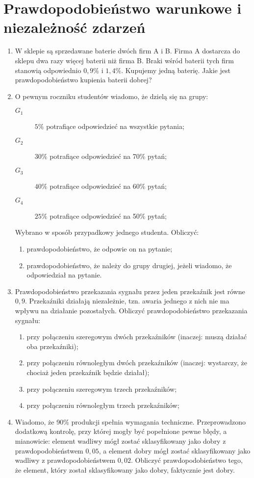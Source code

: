 \documentclass[twoside]{mwart}
\newcommand{\ans}[1]{}
\newcommand{\ans}[1]{\par\emph{Odpowiedź:} #1}
\begin{document}
\section{Prawdopodobieństwo warunkowe i niezależność zdarzeń}
\begin{enumerate}
\item W sklepie są sprzedawane baterie dwóch firm A i B. Firma A dostarcza do sklepu dwa razy więcej baterii niż firma B. Braki wśród baterii tych firm stanowią odpowiednio $0{,}9\%$ i $1{,}4\%$. Kupujemy jedną baterię. Jakie jest prawdopodobieństwo kupienia baterii dobrej?
\item O pewnym roczniku studentów wiadomo, że dzielą się na grupy:
\begin{description}
\item[$G_1$] $5\%$ potrafiące odpowiedzieć na wszystkie pytania;
\item[$G_2$] $30\%$ potrafiące odpowiedzieć na 70\% pytań;
\item[$G_3$] $40\%$ potrafiące odpowiedzieć na 60\% pytań;
\item[$G_4$] $25\%$ potrafiące odpowiedzieć na 50\% pytań;
\end{description}
Wybrano w sposób przypadkowy jednego studenta. Obliczyć:
\begin{enumerate}
\item prawdopodobieństwo, że odpowie on na pytanie; \ans{$P(O)=\sum P(O|G_i)P(G_i)=0{,}625$}
\item prawdopodobieństwo, że należy do grupy drugiej, jeżeli wiadomo, że odpowiedział na pytanie. \ans{$P(G_2|O)=\frac{P(O|G_2)|P(G_2)}{P(O)}=0{,}336$}
\end{enumerate}
\item Prawdopodobieństwo przekazania sygnału przez jeden przekaźnik jest równe $0{,}9$. Przekaźniki działają niezależnie, tzn. awaria jednego z nich nie ma wpływu na działanie pozostałych.
Obliczyć prawdopodobieństwo przekazania sygnału:
\begin{enumerate}
\item przy połączeniu szeregowym dwóch przekaźników (inaczej: muszą działać oba przekaźniki);
\item przy połączeniu równoległym dwóch przekaźników (inaczej: wystarczy, że chociaż jeden przekaźnik będzie działał);
\item przy połączeniu szeregowym trzech przekaźników;
\item przy połączeniu równoległym trzech przekaźników;
\end{enumerate}
\item Wiadomo, że 90\% produkcji spełnia wymagania techniczne. Przeprowadzono dodatkową kontrolę, przy której mogły być popełnione pewne błędy, a mianowicie: element wadliwy mógł zostać sklasyfikowany jako dobry z prawdopodobieństwem $0{,}05$, a element dobry mógł zostać sklasyfikowany jako wadliwy z prawdopodobieństwem $0{,}02$. Obliczyć prawdopodobieństwo tego, że element, który został sklasyfikowany jako dobry, faktycznie jest dobry. \ans{$P(S|K)=\frac{P(K|S)P(S)}{P(K)}=\frac{(1-P(K'|S))P(S)}{(1-P(K'|S))P(S)+P(K|S')P(S')}=\frac{(1-0{,}02)0{,}9}{(1-0{,}02)0{,}9+0{,}05\cdot0{,}1}\approx0{,}994$}



\end{enumerate}
\end{document}
